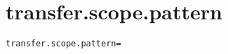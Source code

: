\section{transfer.scope.pattern}
\label{configuration:TransferScopePattern}
\AvailableInCsharpOnly{\TODO}
\begin{lstlisting}[style=Props,caption={Usage example for \textit{transfer.scope.pattern}}]
transfer.scope.pattern=
\end{lstlisting}